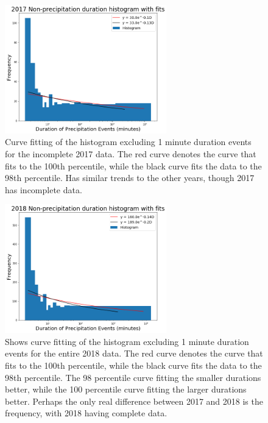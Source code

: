 \documentclass[11pt]{report}
\begin{document}
\clearpage
\begin{figure}[t]
\centering
\includegraphics[width=0.625\textwidth]{Figures/nonprecip_2017_new.png}
\caption[2017 Non-precipitation duration Exponentials with contrasting curve fitting]

{\label{nonprecip17_redone}Curve fitting of the histogram excluding 1 minute
  duration events for the incomplete 2017 data. The red curve denotes the
  curve that fits to the 100th percentile, while the black curve fits the
  data to the 98th percentile. Has similar trends to the other years, though
  2017 has incomplete data.}
\end{figure}

\begin{figure}[b]
  \centering
  \includegraphics[width=0.625\textwidth]{Figures/nonprecip_2018_new.png}
  \caption[2018 Non-precipitation duration Exponentials with contrasting curve fitting]
  {\label{nonprecip18_redone} Shows curve fitting of the histogram excluding
    1 minute duration events for the entire 2018 data. The red curve denotes
    the curve that fits to the 100th percentile, while the black curve fits
    the data to the 98th percentile. The 98 percentile curve fitting the
    smaller durations better, while the 100 percentile curve fitting the
    larger durations better.  Perhaps the only real difference between 2017
    and 2018 is the frequency, with 2018 having complete data.}
\end{figure}
\end{document}
